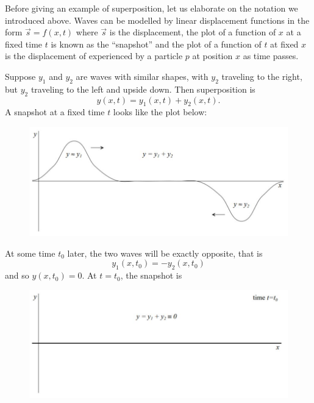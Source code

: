 Before giving an example of superposition, let us elaborate on the notation we introduced above. Waves can be modelled by linear displacement functions in the form $\vec{s} = f(x, t)$ where $\vec{s}$ is the displacement, the plot of a function of $x$ at a fixed time $t$ is known as the ``snapshot'' and the plot of a function of $t$ at fixed $x$ is the displacement of experienced by a particle $p$ at position $x$ as time passes.

Suppose $y_1$ and $y_2$ are waves with similar shapes, with $y_2$ traveling to the right, but $y_2$ traveling to the left and upside down. Then superposition is
\begin{equation*}
    y(x, t) = y_1(x, t) + y_2(x, t).
\end{equation*}
A snapshot at a fixed time $t$ looks like the plot below:
\begin{figure}[h!]
    \centering
    \includegraphics{notes/images/Superposition-1.JPG}
\end{figure}
\FloatBarrier
\noindent At some time $t_0$ later, the two waves will be exactly opposite, that is
\begin{equation*}
    y_1 (x, t_0) = -y_2(x, t_0)
\end{equation*}
and so $y(x, t_0) = 0$. At $t = t_0$, the snapshot is
\begin{figure}[h!]
    \centering
    \includegraphics{notes/images/Superposition-2.JPG}
\end{figure}
